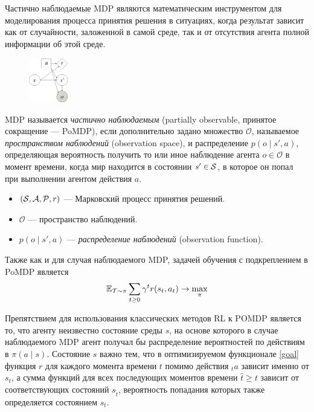 \documentclass[../main.tex]{subfiles}
\begin{document}
Частично наблюдаемые MDP являются математическим инструментом для моделирования процесса принятия решения в ситуациях, когда результат зависит как от случайности, заложенной  в самой среде, так и от отсутствия агента полной информации об этой среде.

\begin{figure}
	\vspace{-0.4cm}
	\centering
	\includegraphics[width=0.15\textwidth]{Images/PoMDP.drawio.png}
	\vspace{-0.4cm}
\end{figure}

	MDP называется \emph{частично наблюдаемым} (partially observable, принятое сокращение --- PoMDP), если дополнительно задано множество $\mathcal{O}$, называемое \emph{пространством наблюдений} (observation space), и распределение $p(o \mid s', a)$, определяющая вероятность получить то или иное наблюдение агента $o \in \mathcal{O}$ в момент времени, когда мир находится в состоянии $s' \in \mathcal{S}$, в которое он попал при выполнении агентом действия $a$.
	\begin{itemize}
		\item $(\mathcal{S}, \mathcal{A}, \mathcal{P}, r)$ --- Марковский процесс принятия решений.
		\item $\mathcal{O}$ --- пространство наблюдений.
		\item $p(o \mid s', a)$ --- \emph{распределение наблюдений} (observation function).
	\end{itemize}



Также как и для случая наблюдаемого MDP, задачей обучения с подкреплением в PoMDP является
\begin{equation*}
	\mathbb{E}_{\mathcal{T} \sim \pi} \sum_{t \ge 0} \gamma^t r(s_t, a_t) \to \max_{\pi}
\end{equation*} 


Препятствием для использования классических методов RL к POMDP является то, что агенту неизвестно состояние среды $s$, на основе которого в  случае наблюдаемого MDP агент получал бы распределение вероятностей по действиям в $\pi(a \mid s)$. Состояние $s$ важно тем, что в оптимизируемом функционале \eqref{goal} функция $r$ для каждого момента времени $t$ помимо действия $_ta$ зависит именно от $s_t$, а сумма функций для всех последующих моментов времени $\hat{t} \ge t$ зависит от соответствующих состояний $s_{\hat{t}}$, вероятность попадания которых также определяется состоянием $s_t$.
\end{document}
